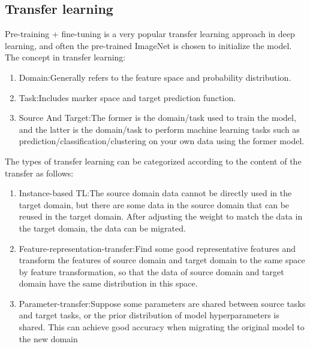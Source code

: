 \subsection{Transfer learning}

Pre-training + fine-tuning is a very popular transfer learning approach in deep learning, and often the pre-trained ImageNet is chosen to initialize the model.
The concept in transfer learning:
\begin{enumerate}[\qquad  1.]
	\item Domain:Generally refers to the feature space and probability distribution.
	\item Task:Includes marker space and target prediction function.
	\item Source And Target:The former is the domain/task used to train the model, and the latter is the domain/task to perform machine learning tasks such as prediction/classification/clustering on your own data using the former model.
\end{enumerate}

The types of transfer learning can be categorized according to the content of the transfer as follows:
\begin{enumerate}[\qquad  1.]
	\item Instance-based TL:The source domain data cannot be directly used in the target domain, but there are some data in the source domain that can be reused in the target domain. After adjusting the weight to match the data in the target domain, the data can be migrated.
	\item Feature-representation-transfer:Find some good representative features and transform the features of source domain and target domain to the same space by feature transformation, so that the data of source domain and target domain have the same distribution in this space.
	\item Parameter-transfer:Suppose some parameters are shared between source tasks and target tasks, or the prior distribution of model hyperparameters is shared. This can achieve good accuracy when migrating the original model to the new domain
\end{enumerate}

